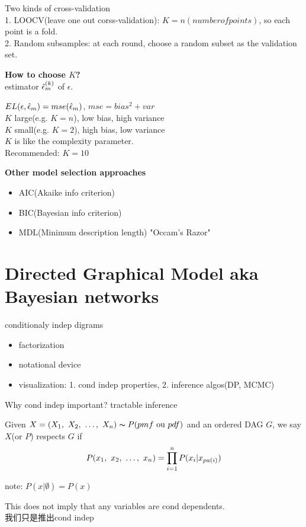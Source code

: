 \documentclass{article}
\begin{document}
Two kinds of cross-validation\\
1. LOOCV(leave one out corss-validation): $K = n(number of points)$, so each point is a fold.\\
2. Random subsamples: at each round, choose a random subset as the validation set.

\textbf{How to choose $K$?}\\
estimator $\hat{\epsilon}_m^{(k)}$ of $\epsilon$.

$EL(\epsilon,\hat{\epsilon}_m) = mse(\hat{\epsilon}_m)$, $mse = bias^2 + var$\\
$K$ large(e.g. $K=n$), low bias, high variance\\
$K$ small(e.g. $K=2$), high bias, low variance\\
$K$ is like the complexity parameter.\\
Recommended: $K = 10$

\textbf{Other model selection approaches}
\begin{itemize}
\item AIC(Akaike info criterion)
\item BIC(Bayesian info criterion)
\item MDL(Minimum description length) "Occam's Razor"
\end{itemize}

\section{Directed Graphical Model aka Bayesian networks}
conditionaly indep digrams
\begin{itemize}
\item factorization
\item notational device
\item visualization: 1. cond indep properties, 2. inference algos(DP, MCMC)
\end{itemize}

Why cond indep important?
tractable inference

\begin{definition}
Given $X = (X_1,~X_2,~\ldots,~X_n) \thicksim{P}(pmf \textrm{ ou } pdf)$ and an ordered DAG $G$, we say $X$(or $P$) respects $G$ if
$$P(x_1,~x_2,~\ldots,~x_n) = \prod_{i=1}^n P(x_i|x_{pa(i)})$$
\end{definition}
note: $P(x|\emptyset) = P(x)$

\begin{remark}
This does not imply that any variables are cond dependents.\\
我们只是推出cond indep
\end{remark}
\end{document}
